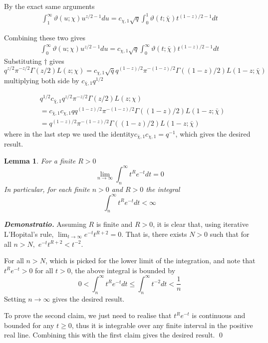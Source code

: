 \documentclass{article}
\newtheorem{lemma}{Lemma}
\theoremstyle{definition}
\theoremstyle{definition}
\theoremstyle{remark}
\renewenvironment{proof}{\vspace{0.4cm}\noindent\small{\emph{Demonstratio.}}}{\qed\vspace{0.4cm}}
\renewcommand{\emph}[1]{\textbf{\textit{#1}}}
\begin{document}
By the exact same arguments
\begin{align}
	\int_1^{\infty} \vartheta(u;\chi) u^{z/2-1} du =  c_{\chi,1} \sqrt{q} \int^{1}_{0} \vartheta(t;\bar{\chi})t^{(1-z)/2 - 1} dt
\end{align}

Combining these two gives
\begin{align}
	\int_0^{\infty} \vartheta(u;\chi) u^{z/2-1} du =  c_{\chi,1} \sqrt{q} \int_{0}^{\infty} \vartheta(t;\bar{\chi})t^{(1-z)/2 - 1} dt
\end{align}
Substituting $\dagger$ gives 
$$
q^{z/2}\pi^{-z/2}\Gamma(z/2)L(z;\chi) = c_{\chi,1} \sqrt{q} q^{(1-z)/2}\pi^{-(1-z)/2}\Gamma((1-z)/2)L(1-z;\bar{\chi}) 
$$
multiplying both side by $c_{\bar{\chi}, 1}q^{1/2}$

\begin{align}
 &q^{1/2} c_{\bar{\chi}, 1} q^{z/2}\pi^{-z/2}\Gamma(z/2)L(z;\chi) 
 \\
 &=  c_{\bar{\chi}, 1} c_{\chi,1} q q^{(1-z)/2}\pi^{-(1-z)/2}\Gamma((1-z)/2)L(1-z;\bar{\chi}) \\ 
 &= q^{(1-z)/2}\pi^{-(1-z)/2}\Gamma((1-z)/2)L(1-z;\bar{\chi})
\end{align}
where in the last step we used the identity$c_{\bar{\chi}, 1}c_{\chi, 1} = q^{-1}$, which gives the desired result.


\newpage
\begin{lemma}\label{lemma:1}
	For a finite $R > 0$ 
	\begin{equation}
		\lim_{n \rightarrow \infty}\int_{n}^{\infty} t^{R} e^{-t} dt = 0
	\end{equation}
	In particular, for each finite $n>0$ and $R>0$ the integral 
	$$
		\int_{n}^{\infty} t^{R} e^{-t} dt < \infty
	$$
\end{lemma}
\begin{proof}
	Assuming $R$ is finite and $R > 0$, it is clear that, using iterative L'Hopital's rule, $\lim_{t \rightarrow \infty} e^{-t}t^{R+2} = 0$.
	That is, there exists $N > 0$ such that for all $n > N,$ $e^{-t}t^{R+2} < t^{-2}$.

	For all $n > N$, which is picked for the lower limit of the integration, and note that $t^R e^{-t} > 0$ for all $t>0$, the above integral is bounded by
	$$
	0 <  \int_{n}^{\infty} t^{R} e^{-t} dt \leq \int_{n}^{\infty} t^{-2} dt < \frac{1}{n}
	$$
	Setting $n \rightarrow \infty$ gives the desired result.

	To prove the second claim, we just need to realise that $t^{R}e^{-t}$ is continuous and bounded for any $t \geq 0$, thus it is integrable over any finite interval in the positive real line.
	Combining this with the first claim gives the desired result.
\end{proof}
\end{document}
